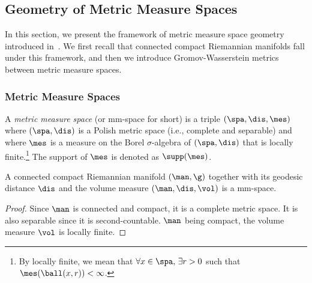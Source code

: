 \subsection{Geometry of Metric Measure Spaces}
In this section, we present the framework of metric measure space geometry introduced in~\cite{sturm2006geometry}. We first recall that 
connected compact Riemannian manifolds fall under this framework, and then we introduce Gromov-Wasserstein metrics between metric measure spaces.

\subsubsection{Metric Measure Spaces}

A {\it metric measure space} (or mm-space for short) is a triple $(\spa,\dis,\mes)$ where $(\spa,\dis)$ is a Polish metric space (i.e., complete and separable)
and where $\mes$ is a measure on the Borel $\sigma$-algebra of $(\spa,\dis)$ 
    that is locally finite.\footnote{By locally finite, we mean that $\forall x\in \spa,\,\exists r>0$ such that $\mes(\ball(x,r))<\infty$.}
The support of $\mes$
is denoted as $\supp(\mes)$.

\begin{proposition}
    A connected compact Riemannian manifold $(\man,\g)$ together with its geodesic distance $\dis$ and the volume measure $(\man,\dis,\vol)$ is a mm-space. 
\end{proposition}

\begin{proof}
Since $\man$ is connected and compact, %
it is a complete metric space. It is also separable since %
it is second-countable. $\man$ being compact, the volume measure
$\vol$ is locally finite.
\end{proof}

